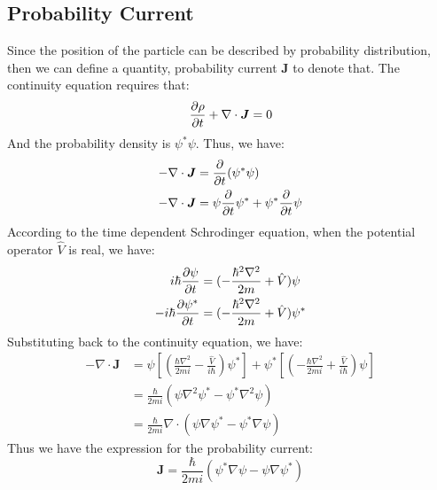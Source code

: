 \documentclass[../main.tex]{subfiles}
\begin{document}
\subsection{Probability Current}
Since the position of the particle can be described by probability distribution, then we can define a quantity, probability current $\bm{J}$ to denote that. The continuity equation requires that:
\begin{equation}
    \pdv{\rho}{t} + \nabla \cdot \bm{J} = 0
\end{equation}
And the probability density is $\psi^*\psi$. Thus, we have:
\begin{align}
    -\nabla \cdot \bm{J} &= \pdv{t}(\psi^*\psi)\nonumber\\
    -\nabla \cdot \bm{J} &= \psi\pdv{t}\psi^* + \psi^*\pdv{t}\psi
\end{align}
According to the time dependent Schrodinger equation, when the potential operator $\hat{V}$ is real, we have:
\begin{align}
    i\hbar \pdv{\psi}{t} &= (-\frac{\hbar^2\nabla^2}{2m} + \hat{V}) \psi\\
    -i\hbar \pdv{\psi^*}{t} &= (-\frac{\hbar^2\nabla^2}{2m} + \hat{V})\psi^*
\end{align}
Substituting back to the continuity equation, we have:
\begin{align}
    -\nabla \cdot \bm{J} &= \psi [(\frac{\hbar\nabla^2}{2mi} - \frac{\hat{V}}{i\hbar})\psi^*] + \psi^* [(-\frac{\hbar\nabla^2}{2mi} + \frac{\hat{V}}{i\hbar}) \psi]\nonumber\\
    &= \frac{\hbar}{2mi}(\psi\nabla^2 \psi^* - \psi^*\nabla^2\psi)\nonumber\\
    &= \frac{\hbar}{2mi}\nabla \cdot(\psi\nabla \psi^* - \psi^*\nabla\psi)
\end{align} 
Thus we have the expression for the probability current:
\begin{equation}
    \bm{J} = \frac{\hbar}{2mi}(\psi^*\nabla \psi - \psi\nabla\psi^*)
\end{equation}
\end{document}
